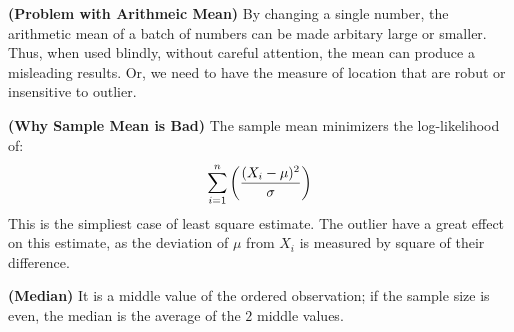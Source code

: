 \begin{remark}{\textbf{(Problem with Arithmeic Mean)}}
    By changing a single number, the arithmetic mean of a batch of numbers can be made arbitary large or smaller. Thus, when used blindly, without careful attention, the mean can produce a misleading results. Or, we need to have the measure of location that are robut or insensitive to outlier. 
\end{remark}

\begin{remark}{\textbf{(Why Sample Mean is Bad)}}
    The sample mean minimizers the log-likelihood of:
    \begin{equation*}
        \sum^n_{i=1}\left( \frac{(X_i - \mu)^2}{\sigma} \right)
    \end{equation*}
    This is the simpliest case of least square estimate. The outlier have a great effect on this estimate, as the deviation of $\mu$ from $X_i$ is measured by square of their difference.
\end{remark}

\begin{definition}{\textbf{(Median)}}
    It is a middle value of the ordered observation; if the sample size is even, the median is the average of the $2$ middle values. 
\end{definition}

